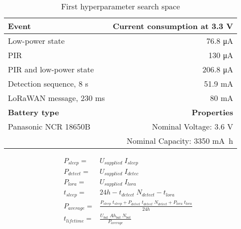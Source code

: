 \begin{table}[ht]
    \centering
    \caption{ First hyperparameter search space}
    \begin{tabular}{lr}    \toprule
        \textbf{Event}                          & \textbf{Current consumption at 3.3 V} \\\midrule
        Low-power state                         & 76.8 \si{\micro\ampere}                \\ 
        PIR                                     & 130 \si{\micro\ampere}                 \\ 
        PIR and low-power state                 & 206.8 \si{\micro\ampere}               \\
        Detection sequence, 8 s                 & 51.9 \si{\milli\ampere}                \\
        LoRaWAN message, 230 \si{\milli\second} & 80 \si{\milli\ampere}                 \\\midrule
        \textbf{Battery type}                   & \textbf{Properties}                   \\
        Panasonic NCR 18650B                    & Nominal Voltage: 3.6 V                \\
                                                & Nominal Capacity: 3350 \si{\milli\ampere\hour}\\\bottomrule
    \end{tabular}
    \label{lifetime_data}
\end{table}

\begin{equation}\label{lifetime_equ}
\begin{aligned}
    P_{sleep} ={} & U_{supplied}\; I_{sleep}\\
P_{detect} ={} & U_{supplied}\; I_{detec}\\
P_{lora} ={} & U_{supplied}\; I_{lora}\\
t_{sleep}     ={} & 24h - t_{detect}\; N_{detect} - t_{lora}\\
P_{average}   ={} & \frac{P_{sleep}\; t_{sleep} + P_{detect}\;t_{detect}\; N_{detect} + P_{lora}\; t_{lora}}{24h}\\
t_{lifetime}  ={} & \frac{U_{bat}\;Ah_{bat}\;N_{bat}}{P_{average}}
\end{aligned}
\end{equation}

